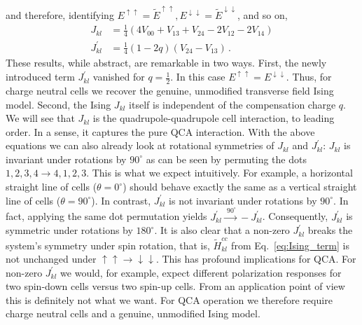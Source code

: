 %
and therefore, identifying $E^{\uparrow\uparrow} = \tilde{E}^{\uparrow\uparrow},
E^{\downarrow\downarrow} = \tilde{E}^{\downarrow\downarrow}$, and so on,
\begin{align}
  \label{eq:J}
  J_{kl}
  &=
  \frac{1}{4} 
  \left(
    4 V_{00} + V_{13} + V_{24} - 2 V_{12} - 2 V_{14}
  \right) \\
  \label{eq:Jprime}
  J^{\prime}_{kl}
  &=
  \frac{1}{4}
  \left( 1 - 2 q \right)
  \left( V_{24} - V_{13} \right) \, .
\end{align}
These results, while abstract, are remarkable in two ways. First, the newly
introduced term $J^{\prime}_{kl}$ vanished for $q=\frac{1}{2}$. In this case
$E^{\uparrow\uparrow} = E^{\downarrow\downarrow}$. Thus, for charge
neutral cells we recover the genuine, unmodified transverse field Ising model.
Second, the Ising $J_{kl}$ itself is independent of the compensation charge $q$.
We will see that $J_{kl}$ is the quadrupole-quadrupole cell interaction, to
leading order. In a sense, it captures the pure QCA interaction. With the above
equations we can also already look at rotational symmetries of $J_{kl}$ and
$J^{\prime}_{kl}$: $J_{kl}$ is invariant under rotations by $90^{\circ}$ as can
be seen by permuting the dots $1,2,3,4 \rightarrow 4,1,2,3$. This is what we
expect intuitively. For example, a horizontal straight line of cells ($\theta
= 0^{\circ}$) should behave exactly the same as a vertical straight line of
cells ($\theta = 90^{\circ}$). In contrast, $J^{\prime}_{kl}$ is not invariant
under rotations by $90^{\circ}$. In fact, applying the same dot permutation
yields $J^{\prime}_{kl} \xrightarrow{\,\, 90^{\circ}}  - J^{\prime}_{kl}$.
Consequently, $J^{\prime}_{kl}$ is symmetric under rotations by $180^{\circ}$.
It is also clear that a non-zero $J^{\prime}_{kl}$ breaks the system's symmetry
under spin rotation, that is, $\tilde{H}^{cc}_{kl}$ from
Eq.~\eqref{eq:Ising_term} is not unchanged under $\uparrow\uparrow \rightarrow
\downarrow\downarrow$. This has profound implications for QCA. For non-zero
$J^{\prime}_{kl}$ we would, for example, expect different polarization responses
for two spin-down cells versus two spin-up cells. From an application point of
view this is definitely not what we want. For QCA operation we therefore require
charge neutral cells and a genuine, unmodified Ising model.

